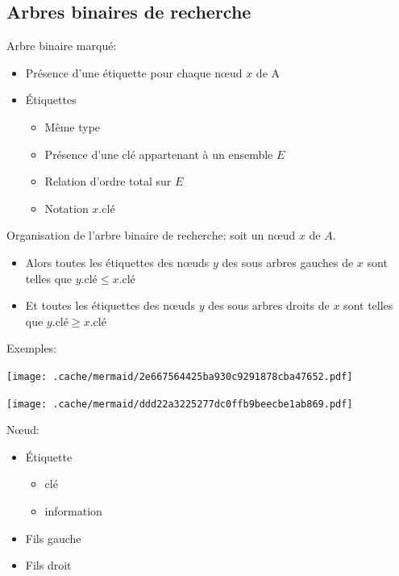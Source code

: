 \hypertarget{arbres-binaires-de-recherche}{%
\subsection{Arbres binaires de
recherche}\label{arbres-binaires-de-recherche}}

Arbre binaire marqué:

\begin{itemize}
\item
  Présence d'une étiquette pour chaque nœud \(x\) de A
\item
  Étiquettes

  \begin{itemize}
  \tightlist
  \item
    Même type
  \item
    Présence d'une clé appartenant à un ensemble \(E\)
  \item
    Relation d'ordre total sur \(E\)
  \item
    Notation \(x.\mathrm{clé}\)
  \end{itemize}
\end{itemize}

Organisation de l'arbre binaire de recherche: soit un nœud \(x\) de
\(A\).

\begin{itemize}
\item
  Alors toutes les étiquettes des nœuds \(y\) des sous arbres gauches de
  \(x\) sont telles que \(y.\mathrm{clé} \leqslant x.\mathrm{clé}\)
\item
  Et toutes les étiquettes des nœuds \(y\) des sous arbres droits de
  \(x\) sont telles que \(y.\mathrm{clé} \geqslant x.\mathrm{clé}\)
\end{itemize}

Exemples:

\texttt{[image: .cache/mermaid/2e667564425ba930c9291878cba47652.pdf]}

\texttt{[image: .cache/mermaid/ddd22a3225277dc0ffb9beecbe1ab869.pdf]}

Nœud:

\begin{itemize}
\tightlist
\item
  Étiquette

  \begin{itemize}
  \tightlist
  \item
    clé
  \item
    information
  \end{itemize}
\item
  Fils gauche
\item
  Fils droit
\end{itemize}

